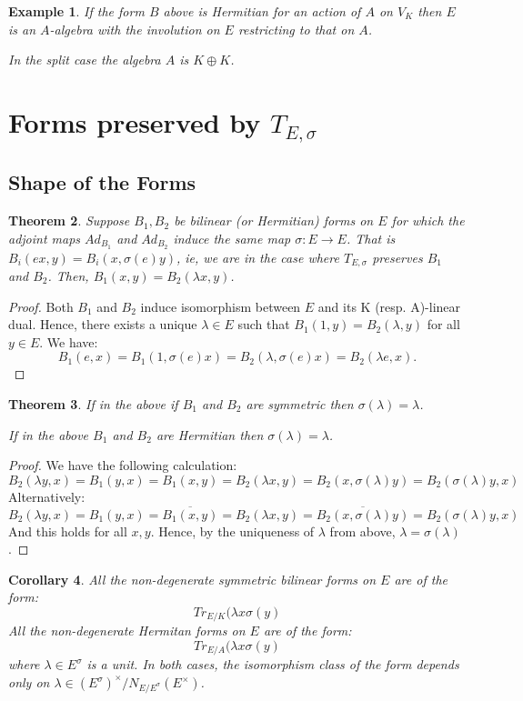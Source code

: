\documentclass{article}
\theoremstyle{plain}
\newtheorem{theorem}{Theorem}[section]
\newtheorem{corollary}[theorem]{Corollary}
\newtheorem{example}[theorem]{Example}
\theoremstyle{definition}
\numberwithin{equation}{section}
\begin{document}
\begin{example}
If the form $B$ above is Hermitian for an action of $A$ on $V_K$ then $E$ is an $A$-algebra with the involution on $E$ restricting to that on $A$.

In the split case the algebra $A$ is $K\oplus K$.
\end{example}

\section{Forms preserved by $T_{E,\sigma}$}

\subsection{Shape of the Forms}

\begin{theorem}
Suppose $B_1,B_2$ be bilinear (or Hermitian) forms on $E$ for which the adjoint maps $Ad_{B_1}$ and $Ad_{B_2}$ induce the same map $\sigma:E\rightarrow E$.
That is $B_i(ex,y) = B_i(x,\sigma(e)y)$, ie, we are in the case where $T_{E,\sigma}$ preserves $B_1$ and $B_2$.
Then, $B_1(x,y) = B_2(\lambda x,y)$.
\end{theorem}
\begin{proof}
Both $B_1$ and $B_2$ induce isomorphism between $E$ and its K (resp. A)-linear dual.
Hence, there exists a unique $\lambda\in E$ such that $B_1(1,y) = B_2(\lambda,y)$ for all $y\in E$.
We have:
\[ B_1(e,x) = B_1(1,\sigma(e)x) = B_2(\lambda,\sigma(e)x) = B_2(\lambda e,x). \]
\end{proof}
\begin{theorem}
If in the above if $B_1$ and $B_2$ are symmetric then $\sigma(\lambda)=\lambda$.

If in the above $B_1$ and $B_2$ are Hermitian then $\sigma(\lambda)=\lambda$.
\end{theorem}
\begin{proof}
We have the following calculation:
\[ B_2(\lambda y,x) = B_1(y,x) = B_1(x,y) = B_2(\lambda x,y) = B_2(x,\sigma(\lambda) y) = B_2(\sigma(\lambda)y,x) \]
Alternatively:
\[ B_2(\lambda y,x) = B_1(y,x) = \overline{B_1(x,y)} = B_2(\lambda x,y) = \overline{B_2(x,\sigma(\lambda) y)} = B_2(\sigma(\lambda)y,x) \]
And this holds for all $x,y$.
Hence, by the uniqueness of $\lambda$ from above, $\lambda=\sigma(\lambda)$.
\end{proof}
\begin{corollary}
All the non-degenerate symmetric bilinear forms on $E$ are of the form:
\[ Tr_{E/K}(\lambda x\sigma(y) \]
All the non-degenerate Hermitan forms on $E$ are of the form:
\[ Tr_{E/A}(\lambda x\sigma(y) \]
where $\lambda \in E^\sigma$ is a unit.
In both cases, the isomorphism class of the form depends only on $\lambda \in (E^\sigma)^\times/N_{E/E^\sigma}(E^\times)$.
\end{corollary}
\end{document}
